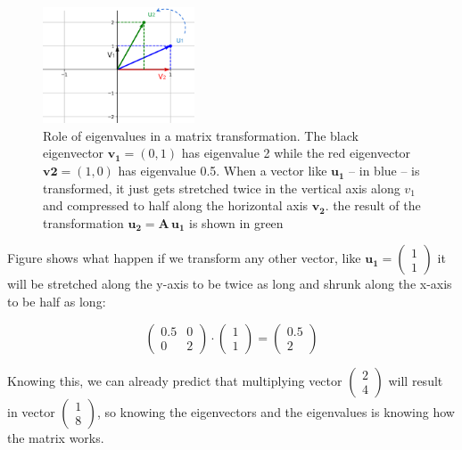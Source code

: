 \documentclass[12pt]{article}
\begin{document}
\begin{figure}
	\begin{center}
		\includegraphics[width=0.4\textwidth]{transform}	
	\end{center}
	\caption{Role of eigenvalues in a matrix transformation. The black eigenvector $\mathbf{v_1} = (0,1)$ has eigenvalue 2 while the red eigenvector $\mathbf{v2}=(1,0)$ has eigenvalue 0.5. When a vector like $\mathbf{u_1}$ -- in blue -- is transformed, it just gets stretched twice in the vertical axis along $v_1$ and compressed to half along the horizontal axis $\mathbf{v_2}$. the result of the transformation $\mathbf{u_2} = \mathbf{A} \, \mathbf{u_1}$ is shown in green}
	\label{fig:transform}
\end{figure}

Figure \label{fig:transform} shows what happen if we transform any other vector, like $\mathbf{u_1}=\begin{pmatrix}  1\\ 1 \end{pmatrix}$ it will be stretched along the y-axis to be twice as long and shrunk along the x-axis to be half as long:

\begin{equation}
	\begin{pmatrix} 0.5 & 0\\ 0 &  2 \end{pmatrix} \cdot \begin{pmatrix}  1\\ 1 \end{pmatrix} = \begin{pmatrix}  0.5\\ 2 \end{pmatrix}
\end{equation}

Knowing this, we can already predict that multiplying vector $\begin{pmatrix}  2\\ 4 \end{pmatrix}$ will result in vector  $\begin{pmatrix}  1\\ 8 \end{pmatrix}$, so knowing the eigenvectors and the eigenvalues is  knowing how the matrix works.
\end{document}
